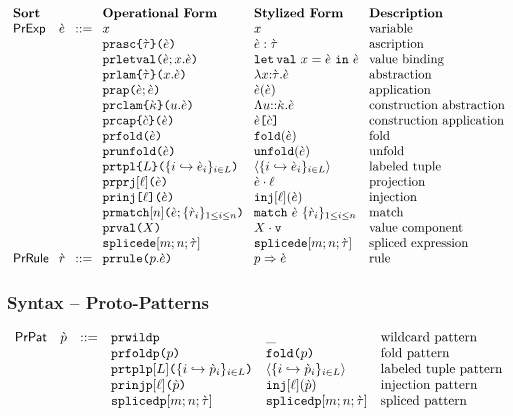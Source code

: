 \[\arraycolsep=4pt\begin{array}{lllllll}
\textbf{Sort} & & & \textbf{Operational Form} & \textbf{Stylized Form} & \textbf{Description}\\
\mathsf{PrExp} & \ce & ::= & x & x & \text{variable}\\
&&& \aceasc{\ctau}{\ce} & \asc{\ce}{\ctau} & \text{ascription}\\
&&& \aceletsyn{x}{\ce}{\ce} & \letsyn{x}{\ce}{\ce} & \text{value binding}\\
&&& \acelam{\ctau}{x}{\ce} & \lam{x}{\ctau}{\ce} & \text{abstraction}\\
&&& \aceap{\ce}{\ce} & \ap{\ce}{\ce} & \text{application}\\
&&& \aceclam{\cekappa}{u}{\ce} & \clam{u}{\cekappa}{\ce} & \text{construction abstraction}\\
&&& \acecap{\ce}{\cec} & \cAp{\ce}{\cec} & \text{construction application}\\
&&& \acefold{\ce} & \fold{\ce} & \text{fold}\\
&&& \aceunfold{\ce} & \unfold{\ce} & \text{unfold}\\
&&& \acetpl{\labelset}{\mapschema{\ce}{i}{\labelset}} & \tpl{\mapschema{\ce}{i}{\labelset}} & \text{labeled tuple}\\
&&& \acepr{\ell}{\ce} & \prj{\ce}{\ell} & \text{projection}\\
&&& \aceanain{\ell}{\ce} & \inj{\ell}{\ce} & \text{injection}\\
&&& \acematchwith{n}{\ce}{\seqschemaX{\crv}} & \matchwith{\ce}{\seqschemaX{\crv}} & \text{match}\\
&&& \acemval{X} & \mval{X} & \text{value component}\\
&&& \acesplicede{m}{n}{\ctau} & \splicede{m}{n}{\ctau} & \text{spliced expression}\\%
\mathsf{PrRule} & \crv & ::= & \acematchrule{p}{\ce} & \matchrule{p}{\ce} & \text{rule}\end{array}\]

\subsubsection{Syntax -- Proto-Patterns}
\[\begin{array}{lllllll}
\mathsf{PrPat} & \cpv & ::= & \acewildp & \wildp & \text{wildcard pattern}\\
&&& \acefoldp{p} & \foldp{p} & \text{fold pattern}\\
&&& \acetplp{\labelset}{\mapschema{\cpv}{i}{\labelset}} & \tplp{\mapschema{\cpv}{i}{\labelset}} & \text{labeled tuple pattern}\\
&&& \aceinjp{\ell}{\cpv} & \injp{\ell}{\cpv} & \text{injection pattern}\\
&&& \acesplicedp{m}{n}{\ctau} & \splicedp{m}{n}{\ctau} & \text{spliced pattern} %
\end{array}\]

